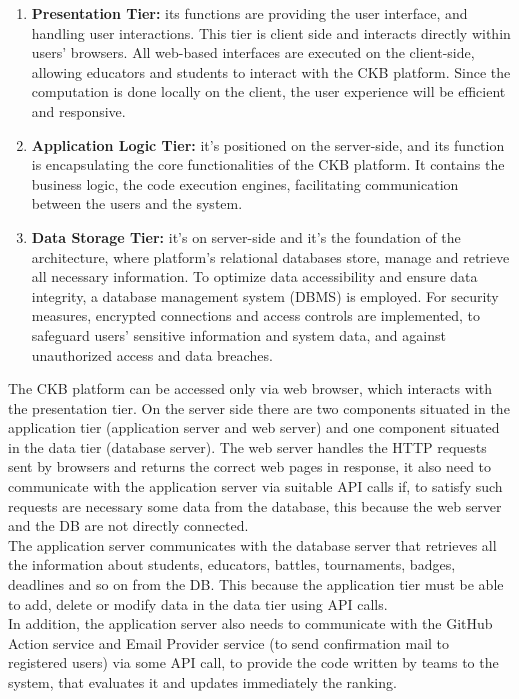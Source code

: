 \begin{enumerate}
\item \textbf{Presentation Tier:} its functions are providing the user interface, and handling user interactions. This tier is client side and interacts directly within users' browsers. All web-based interfaces are executed on the client-side, allowing educators and students to interact with the CKB platform. Since the computation is done locally on the client, the user experience will be efficient and responsive.
\item \textbf{Application Logic Tier:} it’s positioned on the server-side, and its function is encapsulating the core functionalities of the CKB platform.  It contains the business logic, the code execution engines, facilitating communication between the users and the system. 
\item \textbf{Data Storage Tier:} it's on server-side and it's the foundation of the architecture, where platform’s relational databases store, manage and retrieve all necessary information. To optimize data accessibility and ensure data integrity, a database management system (DBMS) is employed. For security measures, encrypted connections and access controls are implemented, to safeguard users’ sensitive information and system data, and against unauthorized access and data breaches.
\end{enumerate}
The CKB platform can be accessed only via web browser, which interacts with the presentation tier. On the server side there are two components situated in the application tier (application server and web server) and one component situated in the data tier (database server). The web server handles the HTTP requests sent by browsers and returns the correct web pages in response, it also need to communicate with the application server via suitable API calls if, to satisfy such requests are necessary some data from the database, this because the web server and the DB are not directly connected.\\
The application server communicates with the database server that retrieves all the information about students, educators, battles, tournaments, badges, deadlines and so on from the DB. This because the application tier must be able to add, delete or modify data in the data tier using API calls. \\
In addition, the application server also needs to communicate with the GitHub Action service and Email Provider service (to send confirmation mail to registered users) via some API call, to provide the code written by teams to the system, that evaluates it and updates immediately the ranking.\\ \\
